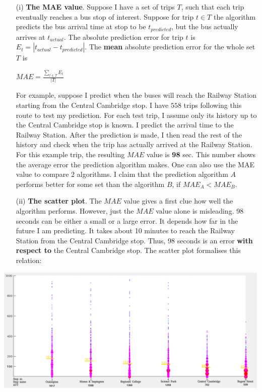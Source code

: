 \documentclass[12pt,a4paper,oneside,openright]{report}
\begin{document}
\begin{enumerate}
\item[(i)]
    \textbf{The MAE value}. Suppose I have a set
    of trips $T$, such that each trip eventually reaches a bus stop of interest. 
    Suppose for trip $t \in T$ the algorithm predicts the bus arrival time
    at stop to be $t_{predicted}$, but the bus actually arrives at $t_{actual}$.
    The absolute prediction error for trip $t$ is
    $E_t = |t_{actual} - t_{predicted}|$. The \textbf{mean} absolute prediction
    error for the whole set $T$ is

    \begin{center}
        $MAE = \frac{\sum\nolimits_{t \in {T}}{E_t}}{|T|}$
    \end{center}

    For example, suppose I predict when the buses will reach the Railway Station
    starting from the Central Cambridge stop. I have $558$ trips
    following this route to test my prediction. For each test trip, I assume
    only its history up to the Central Cambridge stop is known. I predict
    the arrival time to the Railway Station. After the prediction is made,
    I then read the rest of the history and check when the trip has actually
    arrived at the Railway Station. For this example trip, the resulting
    $MAE$ value is \textbf{98} sec. This number shows the average error the
    prediction algorithm makes. One can also use the MAE value to compare
    2 algorithms. I claim that the prediction algorithm $A$ performs better
    for some set than the algorithm $B$, if $MAE_A < MAE_B$.

\item[(ii)] \textbf{The scatter plot}. The $MAE$ value gives a first
   clue how well the algorithm performs. However, just the $MAE$ value
   alone is misleading. 98 seconds can be either a small or a large
   error. It depends how far in the future I am predicting. It takes about 10 
   minutes to reach the Railway Station from the Central Cambridge stop. Thus,
   98 seconds is an error \textbf{with respect to} the Central Cambridge stop. 
   The scatter plot formalises this relation:


\end{enumerate}

\includegraphics[width=\textwidth]{figs/scatter_plot.png} \\
\end{document}
